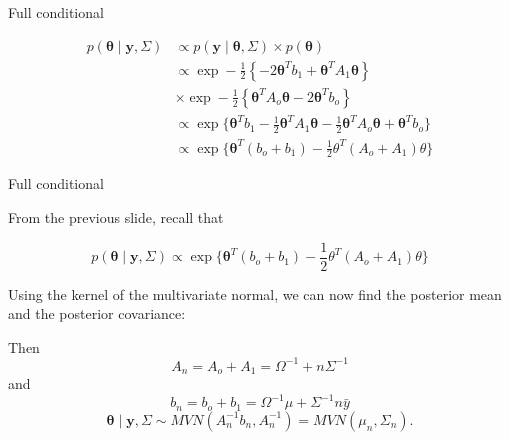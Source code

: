 \documentclass[
  ignorenonframetext,
]{beamer}
\newcommand{\btheta}{{\bm\theta}}
\begin{document}
\begin{frame}{Full conditional}
\protect\hypertarget{full-conditional}{}

\begin{align}
p(\btheta \mid \bm{y}, \Sigma) &\propto
p(\bm{y} \mid \btheta, \Sigma) \times p(\btheta) \\
&\propto 
\exp-\frac{1}{2} {\left \{  -2 \btheta^T b_1+ 
\btheta^T A_1 \btheta \right \}} \\
&\times
\exp-\frac{1}{2} {\left \{\btheta^TA_o \btheta - 2 \btheta^T b_o  \right \}}\\
&\propto \exp\{\btheta^T b_1 - \frac{1}{2}\btheta^T A_1 \btheta- \frac{1}{2}\btheta^TA_o  \btheta
+ \btheta^T b_o\}\\
& \propto\exp\{
\btheta^T( b_o + b_1) -\frac{1}{2}\theta^T(A_o + A_1) \theta
\}
\end{align}

\end{frame}

\begin{frame}{Full conditional}
\protect\hypertarget{full-conditional-1}{}

From the previous slide, recall that

\[p(\btheta \mid \bm{y}, \Sigma) \propto
\exp\{
\btheta^T( b_o + b_1) -\frac{1}{2}\theta^T(A_o + A_1) \theta
\}\]

Using the kernel of the multivariate normal, we can now find the
posterior mean and the posterior covariance:

Then \[A_n = A_o + A_1 = \Omega^{-1}+n\Sigma^{-1}\] and
\[b_n = b_o + b_1 = \Omega^{-1}\mu + \Sigma^{-1} n\bar{y}\]
\[\btheta \mid \bm{y}, \Sigma \sim MVN(A_n^{-1}b_n, A_n^{-1}) = MVN(\mu_n, \Sigma_n).\]

\end{frame}

\end{document}
